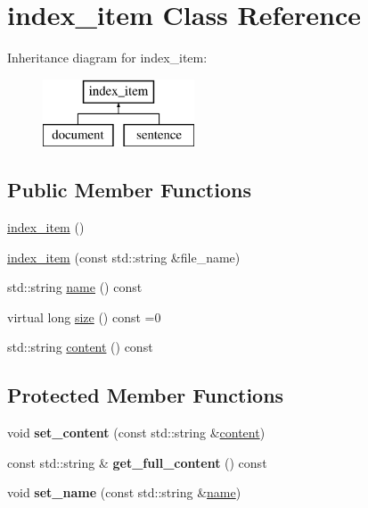 \hypertarget{classindex__item}{}\section{index\+\_\+item Class Reference}
\label{classindex__item}
Inheritance diagram for index\+\_\+item\+:\begin{figure}[H]
\begin{center}
\leavevmode
\includegraphics[height=2.000000cm]{classindex__item}
\end{center}
\end{figure}
\subsection*{Public Member Functions}
\begin{DoxyCompactItemize}
\item 
\hyperlink{classindex__item_a26948d7ad5975fe8160fdedb58df9904}{index\+\_\+item} ()
\item 
\hyperlink{classindex__item_a1afb2c0d82acdec4707ffc1793fba0ff}{index\+\_\+item} (const std\+::string \&file\+\_\+name)
\item 
std\+::string \hyperlink{classindex__item_a1bcb5c577c3986549330c3aa283a6a5e}{name} () const
\item 
virtual long \hyperlink{classindex__item_a7c16d6bca513663fab66d40a6c0289a9}{size} () const =0
\item 
std\+::string \hyperlink{classindex__item_aafe86cc0ad7284d6db317588f63d1cb2}{content} () const
\end{DoxyCompactItemize}
\subsection*{Protected Member Functions}
\begin{DoxyCompactItemize}
\item 
\mbox{\label{classindex__item_aa12a6575ea76795f5f00f2261375cb64}} 
void {\bfseries set\+\_\+content} (const std\+::string \&\hyperlink{classindex__item_aafe86cc0ad7284d6db317588f63d1cb2}{content})
\item 
\mbox{\label{classindex__item_a39c6762ebfec7b2257423eac07bc1041}} 
const std\+::string \& {\bfseries get\+\_\+full\+\_\+content} () const
\item 
\mbox{\label{classindex__item_a219d2cb125fbd81ca0e42bed49ab57d1}} 
void {\bfseries set\+\_\+name} (const std\+::string \&\hyperlink{classindex__item_a1bcb5c577c3986549330c3aa283a6a5e}{name})
\end{DoxyCompactItemize}
